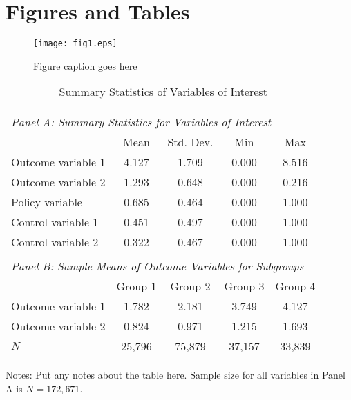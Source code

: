 \documentclass[12pt,english]{article}
\begin{document}
\section*{Figures and Tables}\label{sec:figTables}
\begin{figure}[ht]
\centering
\bigskip{}
\texttt{[image: fig1.eps]}
\caption{Figure caption goes here}
\label{fig:fig1}
\end{figure}

\begin{table}[ht]
\caption{Summary Statistics of Variables of Interest}
\label{tab:descriptives} 
\centering
\begin{threeparttable}
\begin{tabular}{lcccc}
&&&&\\
\multicolumn{5}{l}{\emph{Panel A: Summary Statistics for Variables of Interest}}\\
\toprule
                                                        & Mean  & Std. Dev. & Min   & Max   \\
\midrule
Outcome variable 1                                      & 4.127 & 1.709     & 0.000 & 8.516 \\
Outcome variable 2                                      & 1.293 & 0.648     & 0.000 & 0.216 \\
Policy variable                                         & 0.685 & 0.464     & 0.000 & 1.000 \\
Control variable 1                                      & 0.451 & 0.497     & 0.000 & 1.000 \\
Control variable 2                                      & 0.322 & 0.467     & 0.000 & 1.000 \\
&&&&\\
\multicolumn{5}{l}{\emph{Panel B: Sample Means of Outcome Variables for Subgroups}}\\
\midrule
                                                        & Group 1 & Group 2 & Group 3 & Group 4 \\
\midrule
Outcome variable 1                                      & 1.782  & 2.181  & 3.749  & 4.127  \\
Outcome variable 2                                      & 0.824  & 0.971  & 1.215  & 1.693  \\
\midrule
$N$                                                     & 25,796 & 75,879 & 37,157 & 33,839 \\
\bottomrule
\end{tabular}
\footnotesize Notes: Put any notes about the table here. Sample size for all variables in Panel A is $N=172,671$.
\end{threeparttable}
\end{table}
\end{document}
